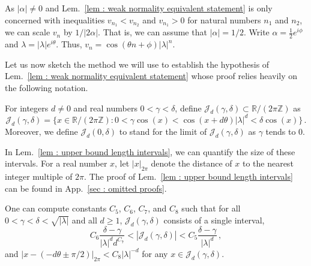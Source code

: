 \documentclass[a4paper,UKenglish,cleveref, autoref, thm-restate]{lipics-v2021}
\begin{document}
As $|\alpha| \ne 0$ and Lem.~\ref{lem : weak normality equivalent
  statement} is only concerned with inequalities $v_{n_1} < v_{n_2}$ and $v_{n_1} > 0$ for natural numbers ${n_1}$ and ${n_2}$, we can scale $v_n$ by $1/|2\alpha|$. 
That is, we can assume that $|\alpha| = 1/2$.
Write $\alpha = \frac{1}{2}e^{i\phi}$ and $\lambda=|\lambda|e^{i\theta}$.
Thus, $v_n = \cos(\theta n + \phi)|\lambda|^n$.

Let us now sketch the method we will use to establish the hypothesis of Lem.~\ref{lem : weak normality equivalent statement} whose proof relies heavily on the following notation.
\begin{definition}\label{definition J}
    For integers $d \ne 0$ and real numbers $0 < \gamma < \delta$, define $\mathcal{J}_d(\gamma, \delta) \subset \mathbb{R}/(2\pi\mathbb{Z})$ as 
    \begin{equation*}
        \mathcal{J}_d(\gamma, \delta) = \Big\{x \in \mathbb{R}/(2\pi\mathbb{Z}): 
        0 < \gamma\cos(x) < \cos(x + d\theta)|\lambda|^d < \delta\cos(x)\Big\} \, .
      \end{equation*}
Moreover, we define  $\mathcal{J}_d(0,\delta)$ to stand for the limit of $\mathcal{J}_d(\gamma,\delta)$ as $\gamma$ tends to $0$.
  \end{definition}
  
In Lem.~\ref{lem : upper bound length intervals}, we can quantify the size of these intervals. 
For a real number $x$, let $|x|_{2\pi}$ denote the distance of $x$ to the nearest integer multiple of $2\pi$.
The proof of Lem.~\ref{lem : upper bound length intervals} can be found in App.~\ref{sec : omitted proofs}.
\begin{lemma}\label{lem : upper bound length intervals}
    One can compute constants $C_5$, $C_6$, $C_7$, and $C_8$ such that for all $0 < \gamma < \delta < \sqrt{|\lambda|}$ and all $d \ge 1$, $\mathcal{J}_d(\gamma,\delta)$ consists of a single interval,
    \begin{equation*}
        C_6\frac{\delta - \gamma}{|\lambda|^dd^{C_7}} <
        |\mathcal{J}_d(\gamma,\delta)| < C_5\frac{\delta -
          \gamma}{|\lambda|^d} \, ,
    \end{equation*}
    and $|x-(-d\theta \pm \pi/2)|_{2\pi} < C_8 |\lambda|^{-d}$ for any
    $x \in \mathcal{J}_d(\gamma,\delta)$.
\end{lemma}
\end{document}
